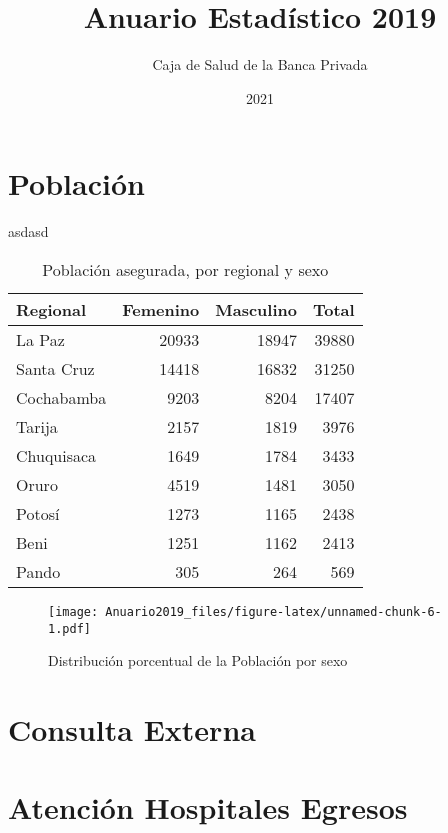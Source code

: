 \documentclass[
]{book}
\title{Anuario Estadístico 2019}
\author{Caja de Salud de la Banca Privada}
\date{2021}
\begin{document}
\maketitle

{
\setcounter{tocdepth}{1}
\tableofcontents
}
\hypertarget{poblaciuxf3n}{%
\chapter{Población}\label{poblaciuxf3n}}

asdasd

\begin{table}

\caption{\label{tab:unnamed-chunk-4}Población asegurada, por regional y sexo}
\centering
\begin{tabular}[t]{lrrr}
\toprule
Regional & Femenino & Masculino & Total\\
\midrule
La Paz & 20933 & 18947 & 39880\\
Santa Cruz & 14418 & 16832 & 31250\\
Cochabamba & 9203 & 8204 & 17407\\
Tarija & 2157 & 1819 & 3976\\
Chuquisaca & 1649 & 1784 & 3433\\
\addlinespace
Oruro & 4519 & 1481 & 3050\\
Potosí & 1273 & 1165 & 2438\\
Beni & 1251 & 1162 & 2413\\
Pando & 305 & 264 & 569\\
\bottomrule
\end{tabular}
\end{table}

\begin{figure}
\centering
\texttt{[image: Anuario2019\_files/figure-latex/unnamed-chunk-6-1.pdf]}
\caption{\label{fig:unnamed-chunk-6}Distribución porcentual de la Población por sexo}
\end{figure}

\hypertarget{consulta-externa}{%
\chapter{Consulta Externa}\label{consulta-externa}}

\hypertarget{atenciuxf3n-hospitales-egresos}{%
\chapter{Atención Hospitales Egresos}\label{atenciuxf3n-hospitales-egresos}}
\end{document}
